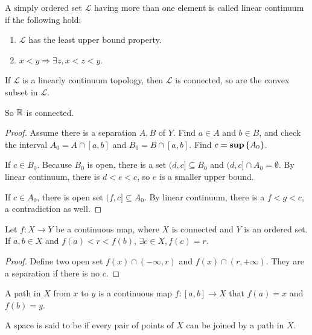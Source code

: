 \begin{definition}
    A simply ordered set $\mathcal{L}$ having more than one element is called linear continuum if the following hold:
    \begin{enumerate}
        \item $\mathcal{L}$ has the least upper bound property.
        \item $x < y \Rightarrow \exists z, x < z < y$.
    \end{enumerate}
\end{definition}

\begin{theorem}
    If $\mathcal{L}$ is a linearly continuum topology, then $\mathcal{L}$ is connected, so are the convex subset in $\mathcal{L}$. 
    
    So $\mathbb{R}$ is connected.
\end{theorem}
\begin{proof}
    Assume there is a separation $A,B$ of $Y$. Find $a \in A$ and $b \in B$, and check the interval $A_0 = A \cap [a,b]$ and $B_0 = B \cap [a,b]$. Find $c = \mathbf{sup} \set{A_0}$. 
    
    If $c \in B_0$. Because $B_0$ is open, there is a set $(d,c] \subseteq B_0$ and $(d,c] \cap A_0 = \emptyset$. By linear continuum, there is $d < e < c$, so $e$ is a smaller upper bound.
    
    If $c \in A_0$, there is open set $(f,c] \subseteq A_0$. By linear continuum, there is a $f < g < c$, a contradiction as well.
\end{proof}


\begin{theorem}
    Let $f : X \rightarrow Y$ be a continuous map, where $X$ is connected and $Y$ is an ordered set. If $a,b \in X$ and $f(a) < r < f(b)$, $\exists c \in X, f(c) = r$.
\end{theorem}
\begin{proof}
    Define two open set $f(x) \cap (-\infty, r)$ and $f(x) \cap (r, +\infty)$. They are a separation if there is no $c$.
\end{proof}

\begin{definition}
    A path in $X$ from $x$ to $y$ is a continuous map $f: [a,b] \rightarrow X$ that $f(a) = x$ and $f(b) = y$.
    
    A space is said to be  if every pair of points of $X$ can be joined by a path in $X$.
\end{definition}

